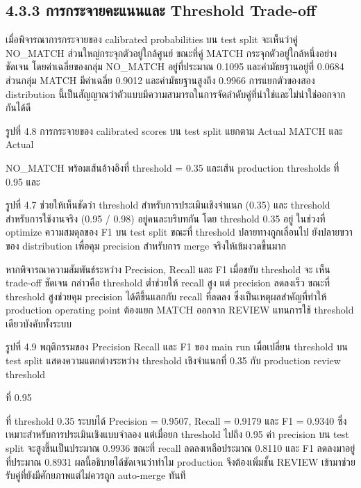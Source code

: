 \documentclass[12pt,a4paper]{report}
\begin{document}
\subsection*{4.3.3 การกระจายคะแนนและ Threshold Trade-off}
เมื่อพิจารณาการกระจายของ calibrated probabilities บน test split จะเห็นว่าคู่ NO\_MATCH ส่วนใหญ่กระจุกตัวอยู่ใกล้ศูนย์ ขณะที่คู่ MATCH กระจุกตัวอยู่ใกล้หนึ่งอย่างชัดเจน โดยค่าเฉลี่ยของกลุ่ม NO\_MATCH อยู่ที่ประมาณ 0.1095 และค่ามัธยฐานอยู่ที่ 0.0684 ส่วนกลุ่ม MATCH มีค่าเฉลี่ย 0.9012 และค่ามัธยฐานสูงถึง 0.9966 การแยกตัวของสอง distribution นี้เป็นสัญญาณว่าตัวแบบมีความสามารถในการจัดลำดับคู่ที่น่าใช่และไม่น่าใช่ออกจากกันได้ดี\par
\clearpage
\begin{center}\small รูปที่ 4.8 การกระจายของ calibrated scores บน test split แยกตาม Actual MATCH และ Actual\end{center}
NO\_MATCH พร้อมเส้นอ้างอิงที่ threshold = 0.35 และเส้น production thresholds ที่ 0.95 และ\par
{}\par
\begin{center}\small รูปที่ 4.7 ช่วยให้เห็นชัดว่า threshold สำหรับการประเมินเชิงจำแนก (0.35) และ threshold สำหรับการใช้งานจริง (0.95 / 0.98) อยู่คนละบริบทกัน โดย threshold 0.35 อยู่ ในช่วงที่ optimize ความสมดุลของ F1 บน test split ขณะที่ threshold ปลายทางถูกเลื่อนไป ยังปลายขวาของ distribution เพื่อคุม precision สำหรับการ merge จริงให้เข้มงวดขึ้นมาก\end{center}
หากพิจารณาความสัมพันธ์ระหว่าง Precision, Recall และ F1 เมื่อขยับ threshold จะ เห็น trade-off ชัดเจน กล่าวคือ threshold ต่ำช่วยให้ recall สูง แต่ precision ลดลงเร็ว ขณะที่ threshold สูงช่วยคุม precision ได้ดีขึ้นแลกกับ recall ที่ลดลง ซึ่งเป็นเหตุผลสำคัญที่ทำให้ production operating point ต้องแยก MATCH ออกจาก REVIEW แทนการใช้ threshold เดียวบังคับทั้งระบบ\par
\begin{center}\small รูปที่ 4.9 พฤติกรรมของ Precision Recall และ F1 ของ main run เมื่อเปลี่ยน threshold บน test split แสดงความแตกต่างระหว่าง threshold เชิงจำแนกที่ 0.35 กับ production review threshold\end{center}
ที่ 0.95\par
\clearpage
ที่ threshold 0.35 ระบบได้ Precision = 0.9507, Recall = 0.9179 และ F1 = 0.9340 ซึ่งเหมาะสำหรับการประเมินเชิงแบบจำลอง แต่เมื่อยก threshold ไปถึง 0.95 ค่า precision บน test split จะสูงขึ้นเป็นประมาณ 0.9936 ขณะที่ recall ลดลงเหลือประมาณ 0.8110 และ F1 ลดลงมาอยู่ที่ประมาณ 0.8931 ผลนี้อธิบายได้ชัดเจนว่าทำไม production จึงต้องเพิ่มชั้น REVIEW เข้ามาช่วยรับคู่ที่ยังมีศักยภาพแต่ไม่ควรถูก auto-merge ทันที\par
\end{document}
